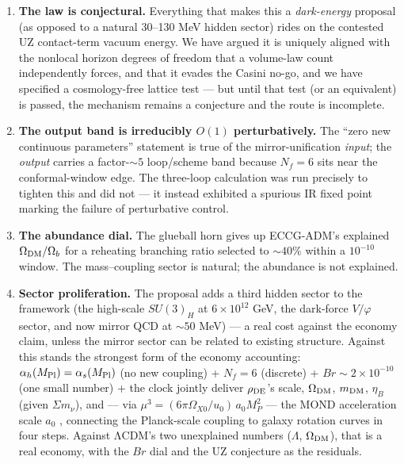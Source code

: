 \documentclass[preprint,12pt]{elsarticle}
\providecommand{\tightlist}{\setlength{\itemsep}{0pt}\setlength{\parskip}{0pt}}
\begin{document}
\begin{enumerate}
\def\labelenumi{\arabic{enumi}.}
\tightlist
\item
  \textbf{The law is conjectural.} Everything that makes this a
  \emph{dark-energy} proposal (as opposed to a natural 30--130 MeV
  hidden sector) rides on the contested UZ contact-term vacuum energy.
  We have argued it is uniquely aligned with the nonlocal horizon
  degrees of freedom that a volume-law count independently forces, and
  that it evades the Casini no-go, and we have specified a
  cosmology-free lattice test --- but until that test (or an equivalent)
  is passed, the mechanism remains a conjecture and the route is
  incomplete.
\item
  \textbf{The output band is irreducibly \(O(1)\) perturbatively.} The
  ``zero new continuous parameters'' statement is true of the
  mirror-unification \emph{input}; the \emph{output} carries a
  factor-\(\sim 5\) loop/scheme band because \(N_f = 6\) sits near the
  conformal-window edge. The three-loop calculation was run precisely to
  tighten this and did not --- it instead exhibited a spurious IR fixed
  point marking the failure of perturbative control.
\item
  \textbf{The abundance dial.} The glueball horn gives up ECCG-ADM's
  explained \(\Omega_{\rm DM}/\Omega_b\) for a reheating branching ratio
  selected to \(\sim 40\%\) within a \(10^{-10}\) window. The
  mass--coupling sector is natural; the abundance is not explained.
\item
  \textbf{Sector proliferation.} The proposal adds a third hidden sector
  to the framework (the high-scale \(SU(3)_H\) at \(6\times10^{12}\)
  GeV, the dark-force \(V/\varphi\) sector, and now mirror QCD at
  \(\sim 50\) MeV) --- a real cost against the economy claim, unless the
  mirror sector can be related to existing structure. Against this
  stands the strongest form of the economy accounting:
  \(\alpha_h(M_{\rm Pl}) = \alpha_s(M_{\rm Pl})\) (no new coupling) +
  \(N_f = 6\) (discrete) + \(Br \sim 2\times10^{-10}\) (one small
  number) + the clock jointly deliver \(\rho_{\rm DE}\)'s scale,
  \(\Omega_{\rm DM}\), \(m_{\rm DM}\), \(\eta_B\) (given
  \(\Sigma m_\nu\)), and --- via
  \(\mu^3 = (6\pi\Omega_{X0}/u_0)\,a_0 M_P^2\) --- the MOND acceleration
  scale \(a_0\) \citep{Bernal:2011wm}, connecting the Planck-scale
  coupling to galaxy rotation curves in four steps. Against ΛCDM's two
  unexplained numbers (\(\Lambda\), \(\Omega_{\rm DM}\)), that is a real
  economy, with the \(Br\) dial and the UZ conjecture as the residuals.

\end{enumerate}
\end{document}
